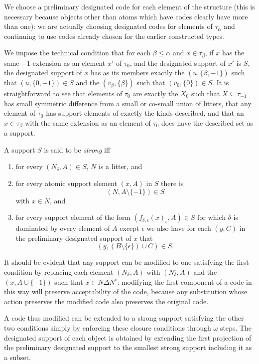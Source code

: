 \documentclass[12pt]{article}
\begin{document}
\begin{enumerate}
We choose a preliminary designated code for each element of the structure (this is necessary because objects other than atoms which have codes clearly have more than one):  we are actually
choosing designated codes for elements of $\tau_\alpha$ and continuing to use codes already chosen for the earlier constructed types.

We impose the technical condition that for each $\beta \leq \alpha$ and $x \in \tau_\beta$, if $x$ has the same $-1$ extension as an element $x'$  of $\tau_0$, and the designated support of $x'$ is $S$, the designated support of $x$ has as its members exactly the $(u,\{\beta,-1\})$ such that $(u,\{0,-1\}) \in S$ and the $(v_\beta,\{\beta\})$ such
that $(v_0,\{0\})\in S$.  It is straightforward to see that elements of $\tau_0$ are exactly the $X_0$ such that $X \subseteq \tau_{-1}$ has small symmetric difference from a small or co-small union of litters, that any element of $\tau_0$ has support elements of exactly the kinds described, and that an $x \in \tau_\beta$ with the same extension as
an element of $\tau_0$ does have the described set as a support.

A support $S$ is said to be {\em strong\/} iff

\begin{enumerate}

\item for every $(N_\delta,A) \in S$, $N$ is a litter, and
\item  for every atomic support element $(x,A)$ in $S$ there is $$(N,A\setminus\{-1\}) \in S$$ with $x \in N$, and 

\item for every support element of the form $(f_{\delta,\epsilon}(x)_\epsilon,A) \in S$ for which $\delta$ is dominated by every element of $A$ except $\epsilon$ we also have for each $(y,C)$ in the preliminary designated support
of $x$ that $$(y,(B \setminus \{\epsilon\})\cup C)\in S.$$

\end{enumerate}  It should be evident that any support can be modified to one satisfying the first condition by replacing each element
$(N_\delta,A)$ with $(N^\circ_\delta,A)$ and the $(x,A\cup \{-1\})$ such that $x \in N \Delta N^\circ$:  modifying the first component of a code
in this way will preserve acceptability of the code, because any substitution whose action preserves the modified code also preserves the original code.

A code thus modified can be extended to a strong support satisfying the other two conditions simply by enforcing these closure conditions through $\omega$ steps.  The designated support of each object is obtained by extending the first projection
of the preliminary designated support to the smallest strong support including  it as a subset.


\end{enumerate}
\end{document}
